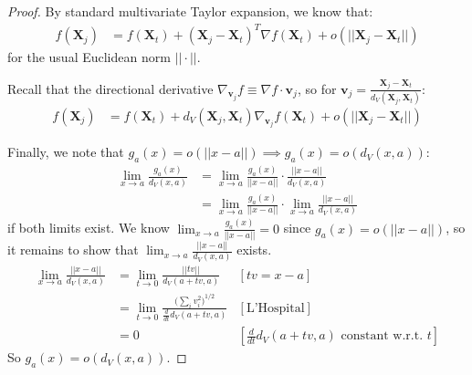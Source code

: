 \documentclass{article}
\newcommand{\ddt}{\frac{d}{dt}}
\newcommand{\Xt}{\mathbf{X}_t}
\newcommand{\Xj}{\mathbf{X}_j}
\newcommand{\vj}{\mathbf{v}_j}
\begin{document}
\begin{proof}
    By standard multivariate Taylor expansion, we know that:
    \begin{align*}
        f(\Xj) 
        &= f(\Xt) + (\Xj - \Xt)^T \nabla f(\Xt) + o(||\Xj - \Xt||)
    \end{align*}
    for the usual Euclidean norm $||\cdot||$.
    
    Recall that the directional derivative $\nabla_{\vj} f \equiv \nabla f \cdot \vj$, so for $\vj = \frac{\Xj -\Xt}{d_V(\Xj, \Xt)}$:
    \begin{align*}
        f(\Xj)
        &= f(\Xt) + d_V(\Xj, \Xt) \nabla_{\vj} f(\Xt) + o(||\Xj - \Xt||)
    \end{align*}
    
    Finally, we note that $g_a(x) = o(||x-a||) \implies g_a(x) = o(d_V(x,a))$:
    \begin{align*}
        \lim_{x \to a} \frac{g_a(x)}{d_V(x,a)}
        &= \lim_{x \to a} \frac{g_a(x)}{||x-a||} \cdot \frac{||x-a||}{d_V(x,a)} \\ 
        &= \lim_{x \to a} \frac{g_a(x)}{||x-a||} \cdot \lim_{x \to a} \frac{||x-a||}{d_V(x,a)}
    \end{align*}
    if both limits exist.
    We know $\lim_{x \to a} \frac{g_a(x)}{||x-a||} = 0$ since $g_a(x) = o(||x-a||)$, so it remains to show that $\lim_{x \to a} \frac{||x-a||}{d_V(x,a)}$ exists.
    \begin{align*}
        \lim_{x \to a} \frac{||x-a||}{d_V(x,a)}
        &= \lim_{t \to 0} \frac{||tv||}{d_V(a+tv,a)} &[tv=x-a]\\
        &= \lim_{t \to 0} \frac{\big(\sum_i v_i^2 \big)^{1/2}}{\ddt d_V(a+tv, a)} &[\text{L'Hospital}] \\
        &= 0 &[\ddt d_V(a+tv, a) \text{ constant w.r.t. } t]
    \end{align*}
    So $g_a(x) = o(d_V(x,a))$.
\end{proof}
\end{document}
